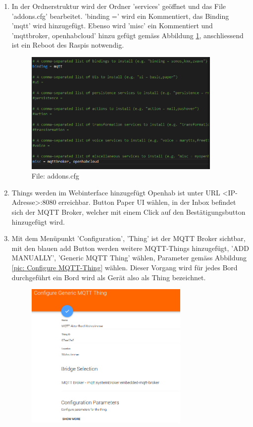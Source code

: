 \begin{enumerate}
	\item In der Ordnerstruktur wird der Ordner 'services' geöffnet und das File 'addons.cfg' bearbeitet. 'binding =' wird ein Kommentiert, das Binding 'mqtt' wird hinzugefügt. Ebenso wird 'misc' ein Kommentiert und 'mqttbroker, openhabcloud' hinzu gefügt gemäss Abbildung \ref{pic: addons.cfg}, anschliessend ist ein Reboot des Raspis notwendig.  
	   \begin{figure}[H]
		\centering
		\includegraphics[width=0.9\textwidth]{graphics/addpnscfg.PNG}
		\caption{File: addons.cfg} 	
		\label{pic: addons.cfg}
	\end{figure} 
\item Things werden im Webinterface hinzugefügt Openhab ist unter URL <IP-Adresse>:8080 erreichbar. Button Paper UI wählen, in der Inbox befindet sich der MQTT Broker, welcher mit einem Click auf den Bestätigungsbutton hinzugefügt wird. 
\item Mit dem Menüpunkt 'Configuration', 'Thing' ist der MQTT Broker sichtbar, mit den blauen add Button werden weitere MQTT-Things hinzugefügt, 'ADD MANUALLY', 'Generic MQTT Thing' wählen, Parameter gemäss Abbildung \ref{pic: Configure MQTT-Thing}  wählen. Dieser Vorgang wird für jedes Bord durchgeführt ein Bord wird als Gerät also als Thing bezeichnet.
	   \begin{figure}[H]
	\centering
	\includegraphics[width=0.75\textwidth]{graphics/MQTT-Thing.PNG}

\end{figure}
\end{enumerate}
